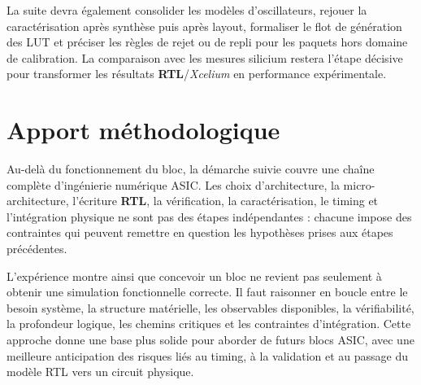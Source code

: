 La suite devra également consolider les modèles d'oscillateurs, rejouer la caractérisation après synthèse puis après layout, formaliser le flot de génération des LUT et préciser les règles de rejet ou de repli pour les paquets hors domaine de calibration. La comparaison avec les mesures silicium restera l'étape décisive pour transformer les résultats \textbf{RTL}/\textit{Xcelium} en performance expérimentale.

\section{Apport méthodologique}

Au-delà du fonctionnement du bloc, la démarche suivie couvre une chaîne complète d'ingénierie numérique ASIC. Les choix d'architecture, la micro-architecture, l'écriture \textbf{RTL}, la vérification, la caractérisation, le timing et l'intégration physique ne sont pas des étapes indépendantes : chacune impose des contraintes qui peuvent remettre en question les hypothèses prises aux étapes précédentes.

L'expérience montre ainsi que concevoir un bloc ne revient pas seulement à obtenir une simulation fonctionnelle correcte. Il faut raisonner en boucle entre le besoin système, la structure matérielle, les observables disponibles, la vérifiabilité, la profondeur logique, les chemins critiques et les contraintes d'intégration. Cette approche donne une base plus solide pour aborder de futurs blocs ASIC, avec une meilleure anticipation des risques liés au timing, à la validation et au passage du modèle RTL vers un circuit physique.

\clearpage

